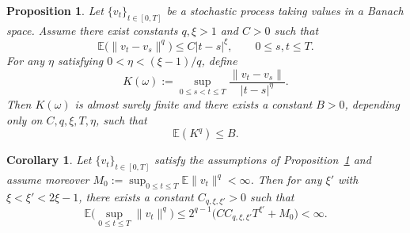 \documentclass[10pt]{article}
\numberwithin{figure}{section}
\numberwithin{equation}{section}
\newtheorem{proposition}[theorem]{Proposition}
\newtheorem{corollary}[theorem]{Corollary}
\newcommand{\0}{{\theta}}
\def\bc{\begin{corollary}}
\def\ec{\end{corollary}}
\begin{document}
\begin{proposition}\label{p1}
Let $\{v_t\}_{t\in[0,T]}$ be a stochastic process taking values in a Banach space. Assume there exist constants $q,\xi>1$ and $C>0$ such that
$$
\mathbb{E}\big(\|v_t-v_s\|^q\big) \le C|t-s|^\xi,\qquad 0\le s,t\le T.
$$
For any $\eta$ satisfying $0<\eta<(\xi-1)/q$, define
$$
K(\omega):=\sup_{0\le s<t\le T}\frac{\|v_t-v_s\|}{|t-s|^\eta}.
$$
Then $K(\omega)$ is almost surely finite and there exists a constant $B>0$, depending only on $C,q,\xi,T,\eta$, such that
$$
\mathbb{E}(K^q) \le B.
$$
\end{proposition}

\bc\label{c3}
Let $\{v_t\}_{t\in[0,T]}$ satisfy the assumptions of Proposition~\ref{p1} and assume moreover $M_0:=\sup_{0\le t\le T}\mathbb{E}\|v_t\|^q<\infty$. Then for any $\xi'$ with $\xi<\xi'<2\xi-1$, there exists a constant $C_{q,\xi,\xi'}>0$ such that
$$
\mathbb{E}\Big(\sup_{0\le t\le T}\|v_t\|^q\Big)\le 2^{q-1}\big(CC_{q,\xi,\xi'}T^{\xi'}+M_0\big)<\infty.
$$
\ec
\end{document}

